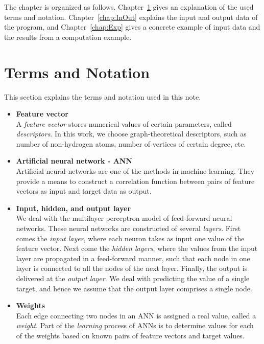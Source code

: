 \documentclass[11pt,titlepage,dvipdfmx,twoside]{book}
\begin{document}
The chapter is organized as follows.
Chapter~\ref{chap:Pre} gives an explanation 
of the used terms and notation.
%
Chapter~\ref{chap:InOut} explains the 
input and output data of the program,
and Chapter~\ref{chap:Exp} gives a concrete
example of input data and the results from a computation example.


\section{Terms and Notation}
\label{chap:Pre}
%
This section explains the terms and notation used in this note.


\begin{itemize}

\item {\bf Feature vector}\\
%
A {\em feature vector} stores numerical values of certain parameters,
called {\em descriptors}.
In this work, we choose graph-theoretical descriptors, such as number of 
non-hydrogen atoms, number of vertices of certain degree, etc.

\item {\bf Artificial neural network - ANN}\\
%
Artificial neural networks are one of the methods in machine learning.
They provide a means to construct a correlation function between 
pairs of feature vectors as input and target data as output.


\item {\bf Input, hidden, and output layer}\\
%
We deal with the multilayer perceptron model 
of feed-forward neural networks.
These neural networks are constructed of several {\em layers}.
First comes the \emph{input layer}, where each neuron takes as input
one value of the feature vector.
Next come the \emph{hidden layers}, where the 
values from the input layer are propagated in a feed-forward manner,
such that each node in one layer is connected to all the nodes of the next layer. 
Finally, the output is delivered at the \emph{output layer}.
We deal with predicting the value of a single target,
and hence we assume that the output layer comprises a single node.

\item {\bf Weights}\\
%
Each edge connecting two nodes in an ANN is assigned a real value,
called a \emph{weight}.
Part of the \emph{learning} process of ANNs is to determine values for each of the weights
based on known pairs of feature vectors and target values.


\end{itemize}
\end{document}
